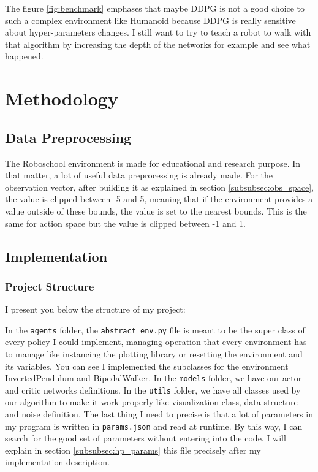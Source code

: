 \documentclass{article}
\begin{document}
The figure \ref{fig:benchmark} emphases that maybe DDPG is not a good choice to
such a complex environment like Humanoid because DDPG is really sensitive about
hyper-parameters changes. I still want to try to teach a robot to walk with that
algorithm by increasing the depth of the networks for example and see what
happened.  

\section{Methodology}

\subsection{Data Preprocessing}

The Roboschool environment is made for educational and research purpose. In that
matter, a lot of useful data preprocessing is already made. For the observation
vector, after building it as explained in section \ref{subsubsec:obs_space}, the
value is clipped between -5 and 5, meaning that if the environment provides a
value outside of these bounds, the value is set to the nearest bounds. This is
the same for action space but the value is clipped between -1 and 1. 

\subsection{Implementation}

\subsubsection{Project Structure}

I present you below the structure of my project:


In the \verb?agents? folder, the \verb?abstract_env.py? file is meant to be the
super class of every policy I could implement, managing operation that every
environment has to manage like instancing the plotting library or resetting the
environment and its variables. You can see I implemented the subclasses for the
environment InvertedPendulum and BipedalWalker. In the \verb?models? folder, we
have our actor and critic networks definitions. In the \verb?utils? folder, we
have all classes used by our algorithm to make it work properly like
visualization class, data structure and noise definition. The last thing I need
to precise is that a lot of parameters in my program is written in
\verb?params.json? and read at runtime. By this way, I can search for the good
set of parameters without entering into the code. I will explain in section
\ref{subsubsec:hp_params} this file precisely after my implementation description.
\end{document}
